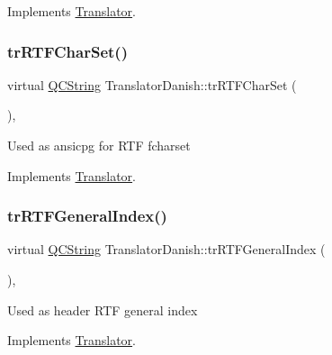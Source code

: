 Implements \mbox{\hyperlink{class_translator_a9953a4c0e6a4fc7d017abcd5c2939e0f}{Translator}}.

\mbox{\label{class_translator_danish_aab009d63da34b815ec122c2d5b4455f1}} 
\subsubsection{\texorpdfstring{trRTFCharSet()}{trRTFCharSet()}}
{\footnotesize\ttfamily virtual \mbox{\hyperlink{class_q_c_string}{Q\+C\+String}} Translator\+Danish\+::tr\+R\+T\+F\+Char\+Set (\begin{DoxyParamCaption}{ }\end{DoxyParamCaption})\hspace{0.3cm}{\ttfamily [inline]}, {\ttfamily [virtual]}}

Used as ansicpg for R\+TF fcharset 

Implements \mbox{\hyperlink{class_translator_afad391f3cbfb5ce6332b7239f8e2049a}{Translator}}.

\mbox{\label{class_translator_danish_a4783025520356d386bfd1f4413fa35c6}} 
\subsubsection{\texorpdfstring{trRTFGeneralIndex()}{trRTFGeneralIndex()}}
{\footnotesize\ttfamily virtual \mbox{\hyperlink{class_q_c_string}{Q\+C\+String}} Translator\+Danish\+::tr\+R\+T\+F\+General\+Index (\begin{DoxyParamCaption}{ }\end{DoxyParamCaption})\hspace{0.3cm}{\ttfamily [inline]}, {\ttfamily [virtual]}}

Used as header R\+TF general index 

Implements \mbox{\hyperlink{class_translator}{Translator}}.

\mbox{\label{class_translator_danish_aa9aaee102538d82916c34baedf0a08c9}} 
